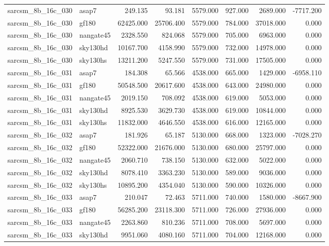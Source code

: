 \begin{tabular}{llrrrrrr}
sarcsm\_8b\_16c\_030 & asap7 & 249.135 & 93.181 & 5579.000 & 927.000 & 2689.000 & -7717.200 \\
sarcsm\_8b\_16c\_030 & gf180 & 62425.000 & 25706.400 & 5579.000 & 784.000 & 37018.000 & 0.000 \\
sarcsm\_8b\_16c\_030 & nangate45 & 2328.550 & 824.068 & 5579.000 & 705.000 & 6963.000 & 0.000 \\
sarcsm\_8b\_16c\_030 & sky130hd & 10167.700 & 4158.990 & 5579.000 & 732.000 & 14978.000 & 0.000 \\
sarcsm\_8b\_16c\_030 & sky130hs & 13211.200 & 5247.550 & 5579.000 & 731.000 & 17505.000 & 0.000 \\
sarcsm\_8b\_16c\_031 & asap7 & 184.308 & 65.566 & 4538.000 & 665.000 & 1429.000 & -6958.110 \\
sarcsm\_8b\_16c\_031 & gf180 & 50548.500 & 20617.600 & 4538.000 & 643.000 & 24980.000 & 0.000 \\
sarcsm\_8b\_16c\_031 & nangate45 & 2019.150 & 708.092 & 4538.000 & 619.000 & 5053.000 & 0.000 \\
sarcsm\_8b\_16c\_031 & sky130hd & 8925.530 & 3629.730 & 4538.000 & 619.000 & 10844.000 & 0.000 \\
sarcsm\_8b\_16c\_031 & sky130hs & 11832.000 & 4646.550 & 4538.000 & 616.000 & 12165.000 & 0.000 \\
sarcsm\_8b\_16c\_032 & asap7 & 181.926 & 65.187 & 5130.000 & 668.000 & 1323.000 & -7028.270 \\
sarcsm\_8b\_16c\_032 & gf180 & 52322.000 & 21676.000 & 5130.000 & 680.000 & 25797.000 & 0.000 \\
sarcsm\_8b\_16c\_032 & nangate45 & 2060.710 & 738.150 & 5130.000 & 632.000 & 5022.000 & 0.000 \\
sarcsm\_8b\_16c\_032 & sky130hd & 8078.410 & 3363.230 & 5130.000 & 589.000 & 9036.000 & 0.000 \\
sarcsm\_8b\_16c\_032 & sky130hs & 10895.200 & 4354.040 & 5130.000 & 590.000 & 10326.000 & 0.000 \\
sarcsm\_8b\_16c\_033 & asap7 & 210.047 & 72.463 & 5711.000 & 740.000 & 1580.000 & -8667.900 \\
sarcsm\_8b\_16c\_033 & gf180 & 56285.200 & 23118.300 & 5711.000 & 726.000 & 27936.000 & 0.000 \\
sarcsm\_8b\_16c\_033 & nangate45 & 2263.860 & 810.236 & 5711.000 & 708.000 & 5697.000 & 0.000 \\
sarcsm\_8b\_16c\_033 & sky130hd & 9951.060 & 4080.160 & 5711.000 & 704.000 & 12168.000 & 0.000 \\

\end{tabular}
